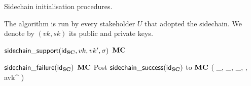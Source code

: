 \begin{algorithm}[H]
  \caption{\label{alg.init}Sidechain initialisation procedures.}
  \smallskip
  The algorithm is run by every stakeholder $U$ that adopted the sidechain. We
  denote by $(vk,sk)$ its public and private keys.
  \smallskip
  \begin{algorithmic}[1]
    \On{$\SidechainAdoption(\idSC)$}
      \Let{\scstate[\idSC]}{\initializing}
      \Post
        {$\mathsf{sidechain\_support}(\mathsf{id}_{\mathbf{SC}},vk,vk',\sigma)$}
        {$\mathbf{MC}$}
    \EndOn

      \If{$\scstate[\idSC]=\initializing$}
        \If{$\ActFail()$}
          \Let{\scstate[\idSC]}{\failed}
          \Post
            {$\mathsf{sidechain\_failure}(\mathsf{id}_{\mathbf{SC}})$}
            {$\mathbf{MC}$}
        \ElsIf{$\ActSuccess()$}
          \Let{\scstate[\idSC]}{\initialized}
          \Let{\jstart}{\ActEpoch()}
          \State Post $\mathsf{sidechain\_success}(\mathsf{id}_{\mathbf{SC}})$ to $\mathbf{MC}$
        \EndIf
      \EndIf
        \Let{\Genesisb}
          {\left(
            \id_\Sidechain,
            \SDb_{\jstart},
            \rndb_{\jstart},
            \params,
            avk^{\jstart}
          \right)}
        \Let{\chainSC}{(\Genesisb)}
      \EndIf
    \EndOn
  \end{algorithmic}
\end{algorithm}
